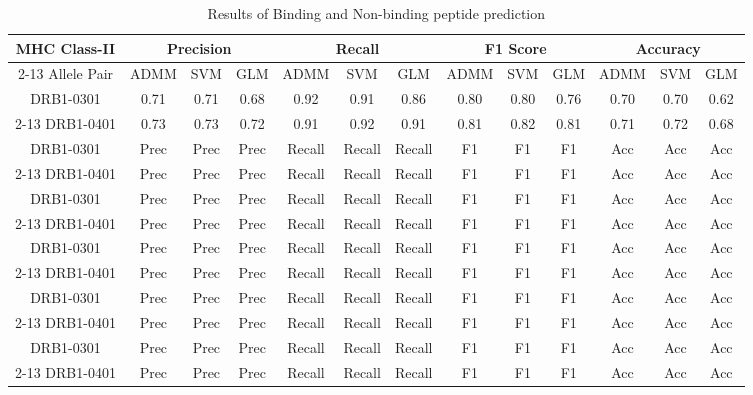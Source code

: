 \documentclass[conference,10pt,draftclsnofoot,onecolumn]{IEEEtran}
\begin{document}
\begin{table}[!t]
\caption{Results of Binding and Non-binding peptide prediction}
\label{tab:resultTable}
\centering
\begin{tabular}{|c|c|c|c|c|c|c|c|c|c|c|c|c|}
\hline
\multirow{2}{*}{MHC Class-II} & \multicolumn{3}{c|}{Precision} & \multicolumn{3}{c|}{Recall} & \multicolumn{3}{c|}{F1 Score} & \multicolumn{3}{c|}{Accuracy}\\ [1pt]
\cline{2-13}
Allele Pair & ADMM & SVM & GLM & ADMM & SVM & GLM & ADMM & SVM & GLM & ADMM & SVM & GLM \\ 
\hline

\multirow{1}{*}{DRB1-0301} & 0.71 & 0.71 & 0.68 & 0.92 & 0.91 & 0.86 & 0.80 & 0.80 & 0.76 & 0.70 & 0.70 & 0.62\\
\cline{2-13}
DRB1-0401 & 0.73 & 0.73 & 0.72 & 0.91 & 0.92 & 0.91 & 0.81 & 0.82 & 0.81 & 0.71 & 0.72 & 0.68\\
\hline

\multirow{1}{*}{DRB1-0301} & Prec & Prec & Prec & Recall & Recall & Recall & F1 & F1 & F1 & Acc & Acc & Acc\\
\cline{2-13}
DRB1-0401 & Prec & Prec & Prec & Recall & Recall & Recall & F1 & F1 & F1 & Acc & Acc & Acc\\
\hline

\multirow{1}{*}{DRB1-0301} & Prec & Prec & Prec & Recall & Recall & Recall & F1 & F1 & F1 & Acc & Acc & Acc\\
\cline{2-13}
DRB1-0401 & Prec & Prec & Prec & Recall & Recall & Recall & F1 & F1 & F1 & Acc & Acc & Acc\\
\hline

\multirow{1}{*}{DRB1-0301} & Prec & Prec & Prec & Recall & Recall & Recall & F1 & F1 & F1 & Acc & Acc & Acc\\
\cline{2-13}
DRB1-0401 & Prec & Prec & Prec & Recall & Recall & Recall & F1 & F1 & F1 & Acc & Acc & Acc\\
\hline

\multirow{1}{*}{DRB1-0301} & Prec & Prec & Prec & Recall & Recall & Recall & F1 & F1 & F1 & Acc & Acc & Acc\\
\cline{2-13}
DRB1-0401 & Prec & Prec & Prec & Recall & Recall & Recall & F1 & F1 & F1 & Acc & Acc & Acc\\
\hline

\multirow{1}{*}{DRB1-0301} & Prec & Prec & Prec & Recall & Recall & Recall & F1 & F1 & F1 & Acc & Acc & Acc\\
\cline{2-13}
DRB1-0401 & Prec & Prec & Prec & Recall & Recall & Recall & F1 & F1 & F1 & Acc & Acc & Acc\\
\hline


\end{tabular}
\end{table}
\end{document}
